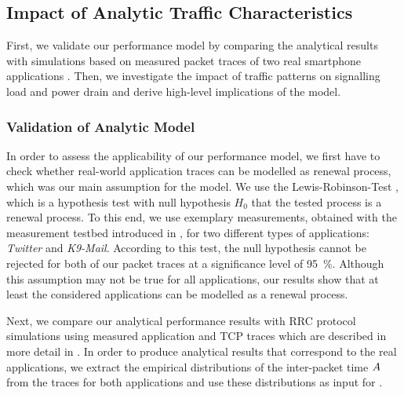 \subsection{Impact of Analytic Traffic Characteristics}\label{sec:network:performance_model:numerical_examples}
First, we validate our performance model by comparing the analytical results with simulations based on measured
packet traces of two real smartphone applications .
Then, we investigate the impact of traffic patterns on signalling load and power drain and derive high-level implications of the model.

\subsubsection*{Validation of Analytic Model}\label{sec:network:performance_model:validations}

In order to assess the applicability of our performance model, we first have to check whether real-world application traces can be modelled as renewal process, which was our main assumption for the model.
We use the Lewis-Robinson-Test \cite{Ascher1984}, which is a hypothesis test with null hypothesis \(H_0\) that the tested process is a renewal process.
To this end, we use exemplary measurements, obtained with the measurement testbed introduced in , for two different types of applications: \emph{Twitter} and \emph{K9-Mail}.
According to this test, the null hypothesis cannot be rejected for both of our packet traces at a significance level of \SI{95}{\percent}.
Although this assumption may not be true for all applications, our results show that at least the considered applications can be modelled as a renewal process.

Next, we compare our analytical performance results with \gls{RRC} protocol simulations using measured application and \gls{TCP} traces which are described in more detail in .
In order to produce analytical results that correspond to the real applications, we extract the empirical distributions of the inter-packet time \(A\) from the traces for both applications and use these distributions as input for .


